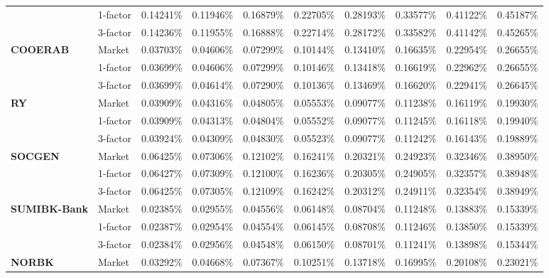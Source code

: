 \documentclass[12pt,a4paper]{article}
\theoremstyle{plain}
\numberwithin{equation}{section}
\begin{document}
\begin{table}[t]
{\begin{tabular}{|rl|cccccccc|}
          & 1-factor & 0.14241\% & 0.11946\% & 0.16879\% & 0.22705\% & 0.28193\% & 0.33577\% & 0.41122\% & 0.45187\% \\
          & 3-factor & 0.14236\% & 0.11955\% & 0.16888\% & 0.22714\% & 0.28172\% & 0.33582\% & 0.41142\% & 0.45265\% \\
    \midrule
    \multicolumn{1}{|l}{\textbf{COOERAB}} & Market & 0.03703\% & 0.04606\% & 0.07299\% & 0.10144\% & 0.13410\% & 0.16635\% & 0.22954\% & 0.26655\% \\
          & 1-factor & 0.03699\% & 0.04606\% & 0.07299\% & 0.10146\% & 0.13418\% & 0.16619\% & 0.22962\% & 0.26655\% \\
          & 3-factor & 0.03699\% & 0.04614\% & 0.07290\% & 0.10136\% & 0.13469\% & 0.16620\% & 0.22941\% & 0.26645\% \\
    \midrule
    \midrule
    \multicolumn{1}{|l}{\textbf{RY}} & Market & 0.03909\% & 0.04316\% & 0.04805\% & 0.05553\% & 0.09077\% & 0.11238\% & 0.16119\% & 0.19930\% \\
          & 1-factor & 0.03909\% & 0.04313\% & 0.04804\% & 0.05552\% & 0.09077\% & 0.11245\% & 0.16118\% & 0.19940\% \\
          & 3-factor & 0.03924\% & 0.04309\% & 0.04830\% & 0.05523\% & 0.09077\% & 0.11242\% & 0.16143\% & 0.19889\% \\
    \midrule
    \midrule
    \multicolumn{1}{|l}{\textbf{SOCGEN}} & Market & 0.06425\% & 0.07306\% & 0.12102\% & 0.16241\% & 0.20321\% & 0.24923\% & 0.32346\% & 0.38950\% \\
\cmidrule{3-10}          & 1-factor & 0.06427\% & 0.07309\% & 0.12100\% & 0.16236\% & 0.20305\% & 0.24905\% & 0.32357\% & 0.38948\% \\
          & 3-factor & 0.06425\% & 0.07305\% & 0.12109\% & 0.16242\% & 0.20312\% & 0.24911\% & 0.32354\% & 0.38949\% \\
    \midrule
    \midrule
    \multicolumn{1}{|l}{\textbf{SUMIBK-Bank}} & Market & 0.02385\% & 0.02955\% & 0.04556\% & 0.06148\% & 0.08704\% & 0.11248\% & 0.13883\% & 0.15339\% \\
\cmidrule{3-10}          & 1-factor & 0.02387\% & 0.02954\% & 0.04554\% & 0.06145\% & 0.08708\% & 0.11246\% & 0.13850\% & 0.15339\% \\
          & 3-factor & 0.02384\% & 0.02956\% & 0.04548\% & 0.06150\% & 0.08701\% & 0.11241\% & 0.13898\% & 0.15344\% \\
    \midrule
    \midrule
    \multicolumn{1}{|l}{\textbf{NORBK}} & Market & 0.03292\% & 0.04668\% & 0.07367\% & 0.10251\% & 0.13718\% & 0.16995\% & 0.20108\% & 0.23021\% \\

\end{tabular}}
\end{table}
\end{document}
